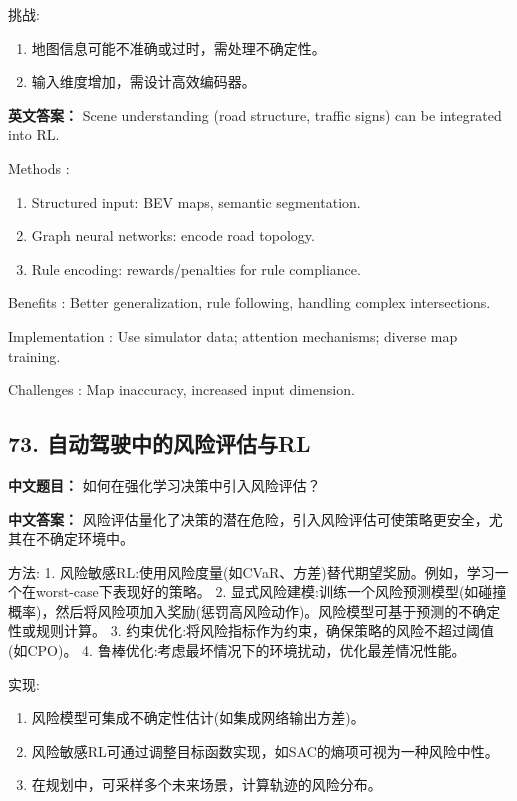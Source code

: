 \documentclass[10pt,a4paper]{ctexart}
\begin{document}
 挑战:
\begin{enumerate}
    \item 地图信息可能不准确或过时，需处理不确定性。
    \item 输入维度增加，需设计高效编码器。
\end{enumerate}

\textbf{英文答案：}  
Scene understanding (road structure, traffic signs) can be integrated into RL.

 Methods :
\begin{enumerate}
    \item Structured input: BEV maps, semantic segmentation.
    \item Graph neural networks: encode road topology.
    \item Rule encoding: rewards/penalties for rule compliance.
\end{enumerate}

 Benefits : Better generalization, rule following, handling complex intersections.

 Implementation : Use simulator data; attention mechanisms; diverse map training.

 Challenges : Map inaccuracy, increased input dimension.

\subsection*{73. 自动驾驶中的风险评估与RL}
\textbf{中文题目：} 如何在强化学习决策中引入风险评估？

\textbf{中文答案：}  
风险评估量化了决策的潜在危险，引入风险评估可使策略更安全，尤其在不确定环境中。

 方法:
1.  风险敏感RL:使用风险度量(如CVaR、方差)替代期望奖励。例如，学习一个在worst-case下表现好的策略。
2.  显式风险建模:训练一个风险预测模型(如碰撞概率)，然后将风险项加入奖励(惩罚高风险动作)。风险模型可基于预测的不确定性或规则计算。
3.  约束优化:将风险指标作为约束，确保策略的风险不超过阈值(如CPO)。
4.  鲁棒优化:考虑最坏情况下的环境扰动，优化最差情况性能。

 实现:
\begin{enumerate}
    \item 风险模型可集成不确定性估计(如集成网络输出方差)。
    \item 风险敏感RL可通过调整目标函数实现，如SAC的熵项可视为一种风险中性。
    \item 在规划中，可采样多个未来场景，计算轨迹的风险分布。
\end{enumerate}
\end{document}
